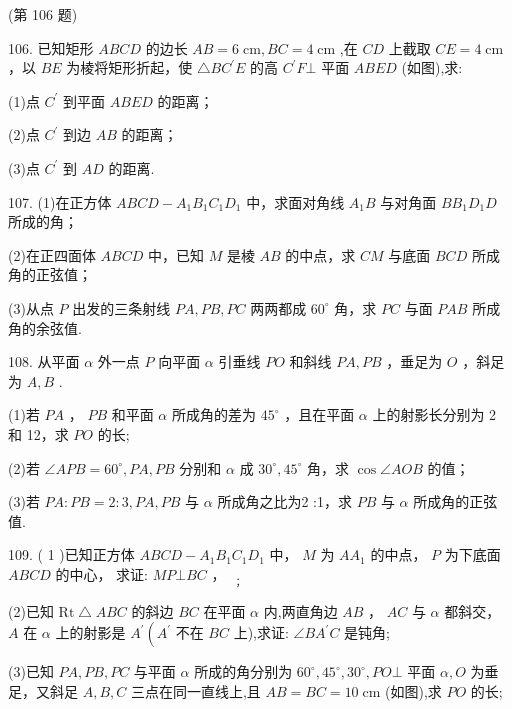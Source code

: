 \documentclass[10pt]{article}
\begin{document}
(第 106 题)

106. 已知矩形 \({ABCD}\) 的边长 \({AB} = 6\mathrm{\;{cm}},{BC} = 4\mathrm{\;{cm}}\) ,在 \({CD}\) 上截取 \({CE} = 4\mathrm{\;{cm}}\) ，以 \({BE}\) 为棱将矩形折起，使 \(\bigtriangleup  B{C}^{\prime }E\) 的高 \({C}^{\prime }F\bot\) 平面 \({ABED}\) (如图),求:

(1)点 \({C}^{\prime }\) 到平面 \({ABED}\) 的距离；

(2)点 \({C}^{\prime }\) 到边 \({AB}\) 的距离；

(3)点 \({C}^{\prime }\) 到 \({AD}\) 的距离.

107. (1)在正方体 \({ABCD} - {A}_{1}{B}_{1}{C}_{1}{D}_{1}\) 中，求面对角线 \({A}_{1}B\) 与对角面 \(B{B}_{1}{D}_{1}D\) 所成的角；

(2)在正四面体 \({ABCD}\) 中，已知 \(M\) 是棱 \({AB}\) 的中点，求 \({CM}\) 与底面 \({BCD}\) 所成角的正弦值；

(3)从点 \(P\) 出发的三条射线 \({PA},{PB},{PC}\) 两两都成 \({60}^{ \circ  }\) 角，求 \({PC}\) 与面 \({PAB}\) 所成角的余弦值.

108. 从平面 \(\alpha\) 外一点 \(P\) 向平面 \(\alpha\) 引垂线 \({PO}\) 和斜线 \({PA},{PB}\) ，垂足为 \(O\) ，斜足为 \(A,B\) .

(1)若 \({PA}\) ， \({PB}\) 和平面 \(\alpha\) 所成角的差为 \({45}^{ \circ  }\) ，且在平面 \(\alpha\) 上的射影长分别为 2 和 12，求 \({PO}\) 的长;

(2)若 \(\angle {APB} = {60}^{ \circ  },{PA},{PB}\) 分别和 \(\alpha\) 成 \({30}^{ \circ  },{45}^{ \circ  }\) 角，求 \(\cos \angle {AOB}\) 的值；

(3)若 \({PA} : {PB} = 2 : 3,{PA},{PB}\) 与 \(\alpha\) 所成角之比为2 :1，求 \({PB}\) 与 \(\alpha\) 所成角的正弦值.

109. ( 1 )已知正方体 \({ABCD} - {A}_{1}{B}_{1}{C}_{1}{D}_{1}\) 中， \(M\) 为 \(A{A}_{1}\) 的中点， \(P\) 为下底面 \({ABCD}\) 的中心， 求证: \({MP}\bot {BC}{\text{ ， }}_{\text{ ； }}\)

(2)已知 \(\mathrm{{Rt}} \bigtriangleup  {ABC}\) 的斜边 \({BC}\) 在平面 \(\alpha\) 内,两直角边 \({AB}\) ， \({AC}\) 与 \(\alpha\) 都斜交， \(A\) 在 \(\alpha\) 上的射影是 \({A}^{\prime }\left( {A}^{\prime }\right.\) 不在 \({BC}\) 上),求证: \(\angle B{A}^{\prime }C\) 是钝角;

(3)已知 \({PA},{PB},{PC}\) 与平面 \(\alpha\) 所成的角分别为 \({60}^{ \circ  },{45}^{ \circ  },{30}^{ \circ  },{PO} \bot\) 平面 \(\alpha ,O\) 为垂足，又斜足 \(A,B,C\) 三点在同一直线上,且 \({AB} = {BC} = {10}\mathrm{\;{cm}}\) (如图),求 \({PO}\) 的长;
\end{document}
